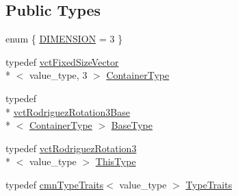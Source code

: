\subsection*{Public Types}
\begin{DoxyCompactItemize}
\item 
enum \{ \hyperlink{classvct_rodriguez_rotation3_a7a58a7aa413585bc569bcf1f22656ae3a8bdaaaae91a14fa58479067f59ed9145}{D\-I\-M\-E\-N\-S\-I\-O\-N} = 3
 \}
\item 
typedef \hyperlink{classvct_fixed_size_vector}{vct\-Fixed\-Size\-Vector}\\*
$<$ value\-\_\-type, 3 $>$ \hyperlink{classvct_rodriguez_rotation3_a14522bb406d3c5c520025d6f1c5f0a82}{Container\-Type}
\item 
typedef \\*
\hyperlink{classvct_rodriguez_rotation3_base}{vct\-Rodriguez\-Rotation3\-Base}\\*
$<$ \hyperlink{classvct_rodriguez_rotation3_a14522bb406d3c5c520025d6f1c5f0a82}{Container\-Type} $>$ \hyperlink{classvct_rodriguez_rotation3_a9808e8703a58127607921c08914bda40}{Base\-Type}
\item 
typedef \hyperlink{classvct_rodriguez_rotation3}{vct\-Rodriguez\-Rotation3}\\*
$<$ value\-\_\-type $>$ \hyperlink{classvct_rodriguez_rotation3_ae212ce4b566eec4c0083226a64ffd0de}{This\-Type}
\item 
typedef \hyperlink{classcmn_type_traits}{cmn\-Type\-Traits}$<$ value\-\_\-type $>$ \hyperlink{classvct_rodriguez_rotation3_a3b8344626fa072324c1dd4e2384f254f}{Type\-Traits}
\end{DoxyCompactItemize}
